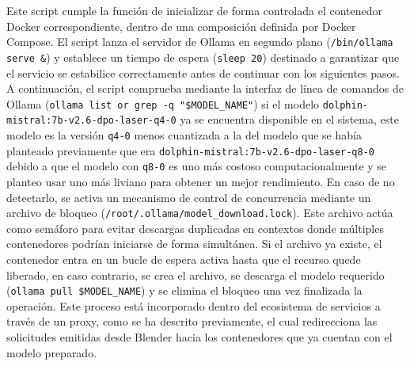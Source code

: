 Este script cumple la función de inicializar de forma controlada el contenedor Docker correspondiente, dentro de una composición definida por Docker Compose. El script lanza el servidor de Ollama en segundo plano (\verb|/bin/ollama serve &|) y establece un tiempo de espera (\verb|sleep 20|) destinado a garantizar que el servicio se estabilice correctamente antes de continuar con los siguientes pasos. A continuación, el script comprueba mediante la interfaz de línea de comandos de Ollama (\verb|ollama list or grep -q "$MODEL_NAME"|) si el modelo \verb|dolphin-mistral:7b-v2.6-dpo-laser-q4-0| ya se encuentra disponible en el sistema, este modelo es la versión \verb|q4-0| menos cuantizada a la del modelo que se había planteado previamente que era \verb|dolphin-mistral:7b-v2.6-dpo-laser-q8-0| debido a que el modelo con \verb|q8-0| es uno más costoso computacionalmente y se planteo usar uno más liviano para obtener un mejor rendimiento. En caso de no detectarlo, se activa un mecanismo de control de concurrencia mediante un archivo de bloqueo (\verb|/root/.ollama/model_download.lock|). Este archivo actúa como semáforo para evitar descargas duplicadas en contextos donde múltiples contenedores podrían iniciarse de forma simultánea. Si el archivo ya existe, el contenedor entra en un bucle de espera activa hasta que el recurso quede liberado, en caso contrario, se crea el archivo, se descarga el modelo requerido (\verb|ollama pull $MODEL_NAME|) y se elimina el bloqueo una vez finalizada la operación. Este proceso está incorporado dentro del ecosistema de servicios a través de un proxy, como se ha descrito previamente, el cual redirecciona las solicitudes emitidas desde Blender hacia los contenedores que ya cuentan con el modelo preparado.


